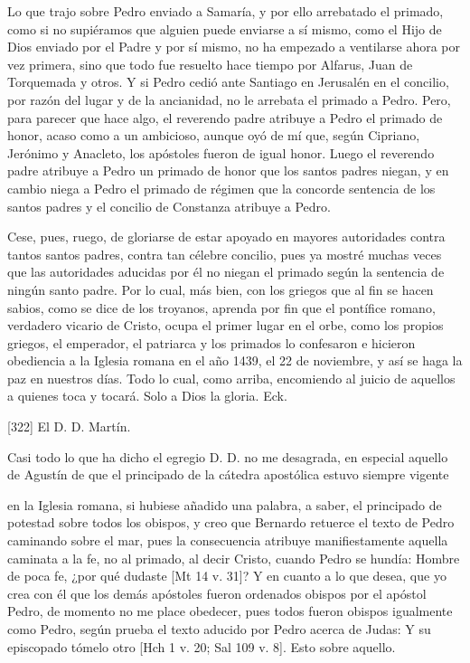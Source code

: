 Lo que trajo sobre Pedro enviado a Samaría, y por ello arrebatado el primado, como si no supiéramos que alguien puede enviarse a sí mismo, como el Hijo de Dios enviado por el Padre y por sí mismo, no ha empezado a ventilarse ahora por vez primera, sino que todo fue resuelto hace tiempo por Alfarus, Juan de Torquemada y otros. Y si Pedro cedió ante Santiago en Jerusalén en el concilio, por razón del lugar y de la ancianidad, no le arrebata el primado a Pedro. Pero, para parecer que hace algo, el reverendo padre atribuye a Pedro el primado de honor, acaso como a un ambicioso, aunque oyó de mí que, según Cipriano, Jerónimo y Anacleto, los apóstoles fueron de igual honor. Luego el reverendo padre atribuye a Pedro un primado de honor que los santos padres niegan, y en cambio niega a Pedro el primado de régimen que la concorde sentencia de los santos padres y el concilio de Constanza atribuye a Pedro.

Cese, pues, ruego, de gloriarse de estar apoyado en mayores autoridades contra tantos santos padres, contra tan célebre concilio, pues ya mostré muchas veces que las autoridades aducidas por él no niegan el primado según la sentencia de ningún santo padre. Por lo cual, más bien, con los griegos que al fin se hacen sabios, como se dice de los troyanos, aprenda por fin que el pontífice romano, verdadero vicario de Cristo, ocupa el primer lugar en el orbe, como los propios griegos, el emperador, el patriarca y los primados lo confesaron e hicieron obediencia a la Iglesia romana en el año 1439, el 22 de noviembre, y así se haga la paz en nuestros días. Todo lo cual, como arriba, encomiendo al juicio de aquellos a quienes toca y tocará. Solo a Dios la gloria. Eck.

[322] El D. D. Martín.

Casi todo lo que ha dicho el egregio D. D. no me desagrada, en especial aquello de Agustín de que el principado de la cátedra apostólica estuvo siempre vigente

en la Iglesia romana, si hubiese añadido una palabra, a saber, el principado de potestad sobre todos los obispos, y creo que Bernardo retuerce el texto de Pedro caminando sobre el mar, pues la consecuencia atribuye manifiestamente aquella caminata a la fe, no al primado, al decir Cristo, cuando Pedro se hundía: Hombre de poca fe, ¿por qué dudaste [Mt 14 v. 31]? Y en cuanto a lo que desea, que yo crea con él que los demás apóstoles fueron ordenados obispos por el apóstol Pedro, de momento no me place obedecer, pues todos fueron obispos igualmente como Pedro, según prueba el texto aducido por Pedro acerca de Judas: Y su episcopado tómelo otro [Hch 1 v. 20; Sal 109 v. 8]. Esto sobre aquello.

